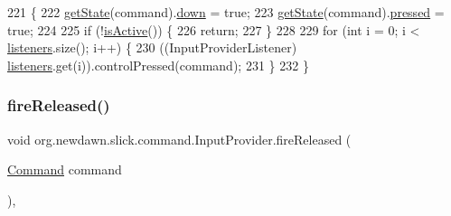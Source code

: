 \begin{DoxyCode}
221                                                 \{
222         \mbox{\hyperlink{classorg_1_1newdawn_1_1slick_1_1command_1_1_input_provider_aa25975d0cc21a4d1a45995c553e72357}{getState}}(command).\mbox{\hyperlink{classorg_1_1newdawn_1_1slick_1_1command_1_1_input_provider_1_1_command_state_a8cfa0dcf27d3c3a5f389bebea44da4b4}{down}} = \textcolor{keyword}{true};
223         \mbox{\hyperlink{classorg_1_1newdawn_1_1slick_1_1command_1_1_input_provider_aa25975d0cc21a4d1a45995c553e72357}{getState}}(command).\mbox{\hyperlink{classorg_1_1newdawn_1_1slick_1_1command_1_1_input_provider_1_1_command_state_a984ed679625be22d8159a28470d7bbd8}{pressed}} = \textcolor{keyword}{true};
224 
225         \textcolor{keywordflow}{if} (!\mbox{\hyperlink{classorg_1_1newdawn_1_1slick_1_1command_1_1_input_provider_a13cd156adf59ef712b9ebb4c0c21f2b8}{isActive}}()) \{
226             \textcolor{keywordflow}{return};
227         \}
228 
229         \textcolor{keywordflow}{for} (\textcolor{keywordtype}{int} i = 0; i < \mbox{\hyperlink{classorg_1_1newdawn_1_1slick_1_1command_1_1_input_provider_a007146935ecc6c0f69ff3d7958042867}{listeners}}.size(); i++) \{
230             ((InputProviderListener) \mbox{\hyperlink{classorg_1_1newdawn_1_1slick_1_1command_1_1_input_provider_a007146935ecc6c0f69ff3d7958042867}{listeners}}.get(i)).controlPressed(command);
231         \}
232     \}
\end{DoxyCode}
\mbox{\label{classorg_1_1newdawn_1_1slick_1_1command_1_1_input_provider_afede03e3ab95cb0248635cf64de6874c}} 
\subsubsection{\texorpdfstring{fire\+Released()}{fireReleased()}}
{\footnotesize\ttfamily void org.\+newdawn.\+slick.\+command.\+Input\+Provider.\+fire\+Released (\begin{DoxyParamCaption}\item[{\mbox{\hyperlink{interfaceorg_1_1newdawn_1_1slick_1_1command_1_1_command}{Command}}}]{command }\end{DoxyParamCaption})\hspace{0.3cm}{\ttfamily [inline]}, {\ttfamily [protected]}}

